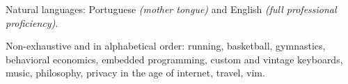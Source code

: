 \documentclass[10pt,a4paper]{article}
\begin{document}
\vspace{0.5em}
\inlineheadsection
  {Natural languages:}
  {Portuguese \emph{(mother tongue)} and English \emph{(full professional proficiency)}.}


\spacedhrule{1.6em}{-0.4em}


\inlineheadsection
  {Non-exhaustive and in alphabetical order:}
  {running, basketball, gymnastics, behavioral economics, embedded programming, custom and vintage keyboards, music, philosophy, privacy in the age of internet, travel, vim.}
\end{document}
